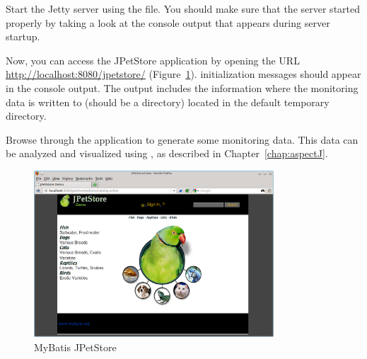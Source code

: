 \begin{compactenum}
\item Start the Jetty server using the  file. You should make %
   sure that the server started properly by taking a look at %
   the console output that appears during server startup.  
\item Now, you can access the JPetStore application by opening the URL
   \url{http://localhost:8080/jpetstore/} (Figure~\ref{fig:jpetstore}). %
   \Kieker{} initialization messages should appear in the console output. %
   The output includes the information where the monitoring data is written to
   (should be a  directory) located in the default %
   temporary directory.
\item  Browse through the application to generate some monitoring data. %
   This data can be analyzed and visualized using \KiekerTraceAnalysis{}, %
   as described in Chapter~\ref{chap:aspectJ}.
\end{compactenum}

\medskip

\begin{figure}[h]\centering
\includegraphics[width=0.8\textwidth]{images/jpetstore-example-FFscrsh}
\caption{MyBatis JPetStore}\label{fig:jpetstore}%
\end{figure}
